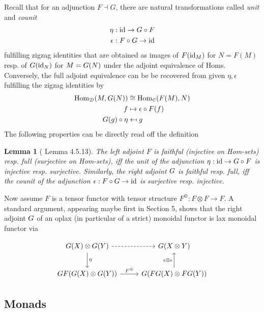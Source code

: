 \documentclass[a4paper, reqno]{amsart}
\newtheorem{lemma}[theorem]{Lemma}
\theoremstyle{introTheorems}
\newcommand\id{\textup{id}}
\newcommand\Hom{\textup{Hom}}
\renewcommand{\1}{\mathbbold{1}}
\begin{document}
Recall that for an adjunction $F\dashv G$, there are natural transformations called \emph{unit} and \emph{counit}  
\begin{align*}
\eta:\; &\id \to \Fra\circ F \\
\epsilon:\;  &F\circ \Fra \to \id 
\end{align*}
fulfilling zigzag identities that are obtained as images  of
$F(\id_{M})$ for $N=F(M)$ resp. of $\Fra(\id_{N})$ for $M={G}(N)$ under the adjoint equivalence of Homs. Conversely, the full adjoint equivalence can be be recovered from given $\eta,\epsilon$ fulfilling the zigzag identities by
\begin{align*}
\Hom_\catD(M,\Fra(N)) 
&\cong\Hom_\catC(F(M),N) \\
f&\mapsto \epsilon\circ F(f) \\
\Fra(g)\circ \eta & \mapsfrom  g 
\end{align*}
The following properties can be directly read off the definition

\begin{lemma}[\cite{Riehl16} Lemma 4.5.13]\label{lm_AdjUnitInjective}
The left adjoint $F$ is faithful (injective on Hom-sets) resp. full (surjective on Hom-sets), iff the unit of the adjunction $\eta:\id\to \Fra\circ F$ is injective resp. surjective.  Similarly, the right adjoint ${G}$ is faithful resp. full, iff the counit of the adjunction $\epsilon:F\circ\Fra\to \id$ is surjective resp. injective. 
\end{lemma}

Now assume $F$ is a tensor functor with tensor structure $F^{\otimes}:F\otimes F\to F$. A standard argument, appearing maybe first in \cite{Dav10} Section 5, shows that the right adjoint ${G}$ of an oplax (in particular of a strict) monoidal functor is lax monoidal functor via

$$\begin{tikzcd}[row sep=5ex, column sep=6ex]
\Fra(X)\otimes \Fra(Y) 
\arrow[r,dashed]
\arrow[d,"\eta"]
&
\Fra(X\otimes Y)
\\
\Fra F(\Fra(X)\otimes \Fra(Y))
\arrow[r,"F^\otimes"]
&
\Fra(F\Fra(X)\otimes F\Fra(Y))
\arrow[u,"\epsilon\otimes \epsilon"]
\end{tikzcd}$$


\subsection{Monads}

\end{document}
